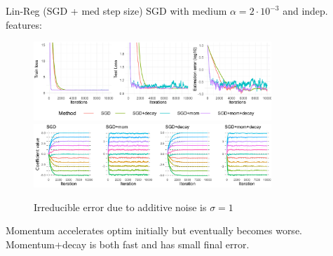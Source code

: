 \documentclass[11pt,compress,t,notes=noshow, xcolor=table]{beamer}
\begin{document}
\begin{vbframe}{Lin-Reg (SGD + med step size)}
\vspace{-0.4cm}
SGD with medium $\alpha=2\cdot10^{-3}$ and indep. features:
\begin{figure}
            \includegraphics[width=0.8\textwidth]{slides/04-multivariate-first-order/figure_man/simu_linmod/SGD_reg_med_lr_iters.pdf} \\
             \includegraphics[width=0.8\textwidth]{slides/04-multivariate-first-order/figure_man/simu_linmod/SGD_reg_coef_med.pdf}\\
            \begin{footnotesize}
                Irreducible error due to additive noise is $\sigma=1$
            \end{footnotesize}
\end{figure}
Momentum accelerates optim initially but eventually becomes worse. Momentum+decay is both fast and has small final error.
\end{vbframe}
\end{document}
